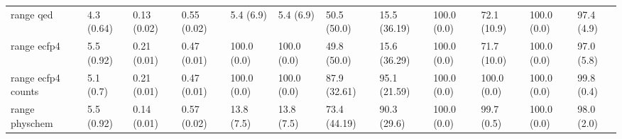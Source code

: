 \begin{tabular}{llllllllllll}
range qed & {\cellcolor[HTML]{F1FAFC}} \color[HTML]{000000} 4.3 (0.64) & {\cellcolor[HTML]{E0F3F5}} \color[HTML]{000000} 0.13 (0.02) & {\cellcolor[HTML]{52B78B}} \color[HTML]{F1F1F1} 0.55 (0.02) & {\cellcolor[HTML]{F7FCFD}} \color[HTML]{000000} 5.4 (6.9) & {\cellcolor[HTML]{F7FCFD}} \color[HTML]{000000} 5.4 (6.9) & {\cellcolor[HTML]{64C1A2}} \color[HTML]{000000} 50.5 (50.0) & {\cellcolor[HTML]{DFF3F5}} \color[HTML]{000000} 15.5 (36.19) & {\cellcolor[HTML]{00441B}} \color[HTML]{F1F1F1} 100.0 (0.0) & {\cellcolor[HTML]{005221}} \color[HTML]{F1F1F1} 72.1 (10.9) & {\cellcolor[HTML]{00441B}} \color[HTML]{F1F1F1} 100.0 (0.0) & {\cellcolor[HTML]{005020}} \color[HTML]{F1F1F1} 97.4 (4.9) \\
range ecfp4 & {\cellcolor[HTML]{EFF9FB}} \color[HTML]{000000} 5.5 (0.92) & {\cellcolor[HTML]{EDF8FB}} \color[HTML]{000000} 0.21 (0.01) & {\cellcolor[HTML]{70C6AC}} \color[HTML]{000000} 0.47 (0.01) & {\cellcolor[HTML]{F7FCFD}} \color[HTML]{000000} 100.0 (0.0) & {\cellcolor[HTML]{F7FCFD}} \color[HTML]{000000} 100.0 (0.0) & {\cellcolor[HTML]{67C2A5}} \color[HTML]{000000} 49.8 (50.0) & {\cellcolor[HTML]{DFF3F5}} \color[HTML]{000000} 15.6 (36.29) & {\cellcolor[HTML]{00441B}} \color[HTML]{F1F1F1} 100.0 (0.0) & {\cellcolor[HTML]{00471C}} \color[HTML]{F1F1F1} 71.7 (10.0) & {\cellcolor[HTML]{00441B}} \color[HTML]{F1F1F1} 100.0 (0.0) & {\cellcolor[HTML]{00451C}} \color[HTML]{F1F1F1} 97.0 (5.8) \\
range ecfp4 counts & {\cellcolor[HTML]{F0F9FB}} \color[HTML]{000000} 5.1 (0.7) & {\cellcolor[HTML]{F4FBFC}} \color[HTML]{000000} 0.21 (0.01) & {\cellcolor[HTML]{72C7AD}} \color[HTML]{000000} 0.47 (0.01) & {\cellcolor[HTML]{F7FCFD}} \color[HTML]{000000} 100.0 (0.0) & {\cellcolor[HTML]{F7FCFD}} \color[HTML]{000000} 100.0 (0.0) & {\cellcolor[HTML]{006B2B}} \color[HTML]{F1F1F1} 87.9 (32.61) & {\cellcolor[HTML]{005321}} \color[HTML]{F1F1F1} 95.1 (21.59) & {\cellcolor[HTML]{00441B}} \color[HTML]{F1F1F1} 100.0 (0.0) & {\cellcolor[HTML]{00471C}} \color[HTML]{F1F1F1} 100.0 (0.0) & {\cellcolor[HTML]{00441B}} \color[HTML]{F1F1F1} 100.0 (0.0) & {\cellcolor[HTML]{00441B}} \color[HTML]{F1F1F1} 99.8 (0.4) \\
range physchem & {\cellcolor[HTML]{EFF9FB}} \color[HTML]{000000} 5.5 (0.92) & {\cellcolor[HTML]{E3F4F7}} \color[HTML]{000000} 0.14 (0.01) & {\cellcolor[HTML]{4BB382}} \color[HTML]{F1F1F1} 0.57 (0.02) & {\cellcolor[HTML]{F7FCFD}} \color[HTML]{000000} 13.8 (7.5) & {\cellcolor[HTML]{F7FCFD}} \color[HTML]{000000} 13.8 (7.5) & {\cellcolor[HTML]{27904C}} \color[HTML]{F1F1F1} 73.4 (44.19) & {\cellcolor[HTML]{006328}} \color[HTML]{F1F1F1} 90.3 (29.6) & {\cellcolor[HTML]{00441B}} \color[HTML]{F1F1F1} 100.0 (0.0) & {\cellcolor[HTML]{00451C}} \color[HTML]{F1F1F1} 99.7 (0.5) & {\cellcolor[HTML]{00441B}} \color[HTML]{F1F1F1} 100.0 (0.0) & {\cellcolor[HTML]{005B25}} \color[HTML]{F1F1F1} 98.0 (2.0) \\

\end{tabular}
